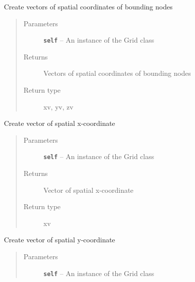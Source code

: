 \documentclass[letterpaper,10pt,english]{sphinxmanual}
\begin{document}
\begin{fulllineitems}
\begin{fulllineitems}
\end{fulllineitems}


\begin{fulllineitems}
\label{hyvr:hyvr.hyvr.grid.Grid.vec_node}
Create vectors of spatial coordinates of bounding nodes
\begin{quote}\begin{description}
\item[{Parameters}] \leavevmode
\textbf{\texttt{self}} -- An instance of the Grid class

\item[{Returns}] \leavevmode
Vectors of spatial coordinates of bounding nodes

\item[{Return type}] \leavevmode
xv, yv, zv

\end{description}\end{quote}

\end{fulllineitems}


\begin{fulllineitems}
\label{hyvr:hyvr.hyvr.grid.Grid.vec_x}
Create vector of spatial x-coordinate
\begin{quote}\begin{description}
\item[{Parameters}] \leavevmode
\textbf{\texttt{self}} -- An instance of the Grid class

\item[{Returns}] \leavevmode
Vector of spatial x-coordinate

\item[{Return type}] \leavevmode
xv

\end{description}\end{quote}

\end{fulllineitems}


\begin{fulllineitems}
\label{hyvr:hyvr.hyvr.grid.Grid.vec_y}
Create vector of spatial y-coordinate
\begin{quote}\begin{description}
\item[{Parameters}] \leavevmode
\textbf{\texttt{self}} -- An instance of the Grid class


\end{description}
\end{quote}
\end{fulllineitems}
\end{fulllineitems}
\end{document}
